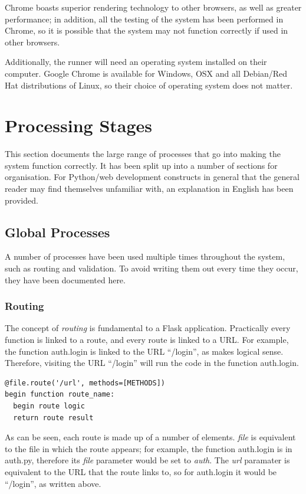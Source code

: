 \documentclass{article}[12pt,a4paper]
\begin{document}
 Chrome boasts superior rendering technology to other browsers, as well as greater performance; in addition, all the testing of the system has been performed in Chrome, so it is possible that the system may not function correctly if used in other browsers. 

 Additionally, the runner will need an operating system installed on their computer. Google Chrome is available for Windows, OSX and all Debian/Red Hat distributions of Linux, so their choice of operating system does not matter.

\section{Processing Stages}
This section documents the large range of processes that go into making the system function correctly. It has been split up into a number of sections for organisation. For Python/web development constructs in general that the general reader may find themselves unfamiliar with, an explanation in English has been provided.

\subsection{Global Processes}
A number of processes have been used multiple times throughout the system, such as routing and validation. To avoid writing them out every time they occur, they have been documented here.

\subsubsection{Routing}
The concept of \textit{routing} is fundamental to a Flask application. Practically every function is linked to a route, and every route is linked to a URL. For example, the function auth.login is linked to the URL ``/login'', as makes logical sense. Therefore, visiting the URL ``/login'' will run the code in the function auth.login. 

\begin{verbatim}
@file.route('/url', methods=[METHODS])
begin function route_name:
  begin route logic
  return route result
\end{verbatim}
As can be seen, each route is made up of a number of elements. \textit{file} is equivalent to the file in which the route appears; for example, the function auth.login is in auth.py, therefore its \textit{file} parameter would be set to \textit{auth}. The \textit{url} paramater is equivalent to the URL that the route links to, so for auth.login it would be ``/login'', as written above.
\end{document}
